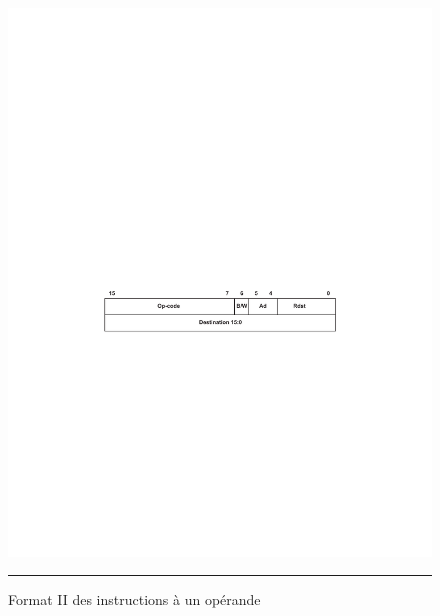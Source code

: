\begin{figure}[htb]
  \centering
  \includegraphics[angle=0, width=14cm]{./Figures/Assembleur/Inst_format_2.pdf}
  \rule{35em}{0.5pt}
  \caption[Schéma Timer]{Format II des instructions à un opérande}
  \label{fig:Inst_format_2}
\end{figure}

